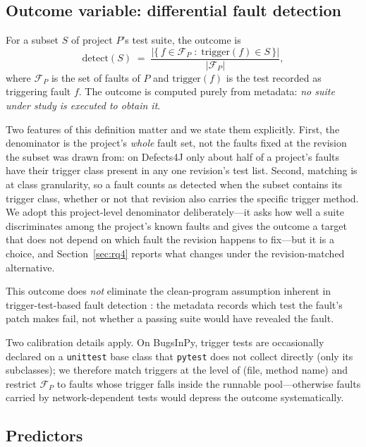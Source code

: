 \documentclass[preprint,12pt]{elsarticle}
\begin{document}
\subsection{Outcome variable: differential fault detection}

For a subset $S$ of project $P$'s test suite, the outcome is
\begin{equation}
\mathrm{detect}(S) \;=\;
\frac{\bigl|\{\, f \in \mathcal{F}_P \;:\; \mathrm{trigger}(f) \in S \,\}\bigr|}
     {\bigl|\mathcal{F}_P\bigr|},
\end{equation}
where $\mathcal{F}_P$ is the set of faults of $P$ and
$\mathrm{trigger}(f)$ is the test recorded as triggering fault $f$. The
outcome is computed purely from metadata: \emph{no suite under study is
executed to obtain it}.

Two features of this definition matter and we state them explicitly. First,
the denominator is the project's \emph{whole} fault set, not the faults
fixed at the revision the subset was drawn from: on Defects4J only about
half of a project's faults have their trigger class present in any one
revision's test list. Second, matching is at class granularity, so a fault
counts as detected when the subset contains its trigger class, whether or
not that revision also carries the specific trigger method. We adopt this
project-level denominator deliberately---it asks how well a suite
discriminates among the project's known faults and gives the outcome a
target that does not depend on which fault the revision happens to fix---but
it is a choice, and Section~\ref{sec:rq4} reports what changes under the
revision-matched alternative.

This outcome does \emph{not} eliminate the clean-program assumption inherent in trigger-test-based fault detection \cite{chekam2017empirical}: the metadata records which test the fault's patch makes fail, not whether a passing suite would have revealed the fault.

Two calibration details apply. On BugsInPy, trigger tests are occasionally
declared on a \texttt{unittest} base class that \texttt{pytest} does not
collect directly (only its subclasses); we therefore match triggers at the
level of (file, method name) and restrict $\mathcal{F}_P$ to faults whose
trigger falls inside the runnable pool---otherwise faults carried by
network-dependent tests would depress the outcome systematically.

\subsection{Predictors}
\end{document}
